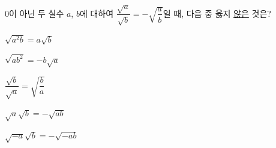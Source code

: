$0$이 아닌 두 실수 $a$, $b$에 대하여 $\dfrac{\sqrt{a}}{\sqrt{b}}=-\sqrt{\dfrac{a}{b}}$일 때, 다음 중 옳지 \underline{않은} 것은?
\begin{choicesii}{\rule[-3ex]{0pt}{8ex}$\sqrt{a^2b}=a\sqrt{b}$}{\rule[-3ex]{0pt}{8ex}$\sqrt{ab^2}=-b\sqrt{a}$}{\rule[-3ex]{0pt}{8ex}$\dfrac{\sqrt{b}}{\sqrt{a}}=\sqrt{\dfrac{b}{a}}$}{\rule[-3ex]{0pt}{8ex}$\sqrt{a}\sqrt{b}=-\sqrt{ab}$}{\rule[-3ex]{0pt}{8ex}$\sqrt{-a}\sqrt{b}=-\sqrt{-ab}$}\end{choicesii}
